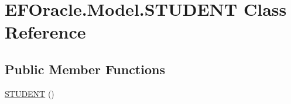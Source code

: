 \hypertarget{class_e_f_oracle_1_1_model_1_1_s_t_u_d_e_n_t}{}\section{E\+F\+Oracle.\+Model.\+S\+T\+U\+D\+E\+NT Class Reference}
\label{class_e_f_oracle_1_1_model_1_1_s_t_u_d_e_n_t}
\subsection*{Public Member Functions}
\begin{DoxyCompactItemize}
\item 
\hyperlink{class_e_f_oracle_1_1_model_1_1_s_t_u_d_e_n_t_a42c5fe0bd0b1873d403c457339dc6387}{S\+T\+U\+D\+E\+NT} ()
\end{DoxyCompactItemize}
